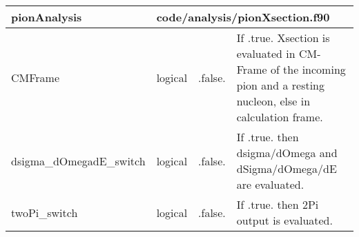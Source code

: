 \documentclass{article}
\begin{document}
\begin{longtable}{llll}
\toprule
\textbf{\large{pionAnalysis}} & \multicolumn{3}{l}{\footnotesize{code/analysis/pionXsection.f90}}\\*
\midrule
\endfirsthead
\midrule
\endhead
CMFrame & \begin{minipage}[t]{2cm}logical\end{minipage} & \begin{minipage}[t]{2cm}.false.\end{minipage} & \begin{minipage}[t]{12cm}If .true. Xsection is evaluated in CM-Frame of the incoming pion and a resting nucleon, else in calculation frame.\end{minipage}\\*
\midrule
dsigma\_dOmegadE\_switch & \begin{minipage}[t]{2cm}logical\end{minipage} & \begin{minipage}[t]{2cm}.false.\end{minipage} & \begin{minipage}[t]{12cm}If .true. then dsigma/dOmega and dSigma/dOmega/dE are evaluated.\end{minipage}\\*
\midrule
twoPi\_switch & \begin{minipage}[t]{2cm}logical\end{minipage} & \begin{minipage}[t]{2cm}.false.\end{minipage} & \begin{minipage}[t]{12cm}If .true. then 2Pi output is evaluated.\end{minipage}\\*
\bottomrule
\end{longtable}
{ }



\end{document}
